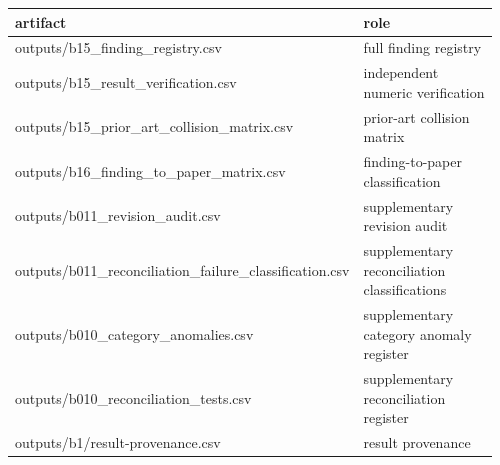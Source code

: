 \begingroup\footnotesize\setlength{\tabcolsep}{3pt}\renewcommand{\arraystretch}{1.15}
\begin{longtable}{P{0.4800\linewidth}P{0.4800\linewidth}}
\toprule
artifact & role \\
\midrule\endhead
outputs/b15\_finding\_registry.csv & full finding registry \\
outputs/b15\_result\_verification.csv & independent numeric verification \\
outputs/b15\_prior\_art\_collision\_matrix.csv & prior-art collision matrix \\
outputs/b16\_finding\_to\_paper\_matrix.csv & finding-to-paper classification \\
outputs/b011\_revision\_audit.csv & supplementary revision audit \\
outputs/b011\_reconciliation\_failure\_classification.csv & supplementary reconciliation classifications \\
outputs/b010\_category\_anomalies.csv & supplementary category anomaly register \\
outputs/b010\_reconciliation\_tests.csv & supplementary reconciliation register \\
outputs/b1/result-provenance.csv & result provenance \\
\bottomrule
\end{longtable}
\endgroup
